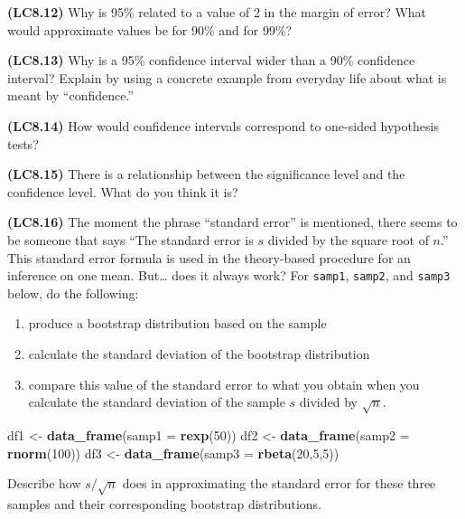 \documentclass[]{tufte-book}
\newenvironment{Shaded}{\begin{snugshade}}{\end{snugshade}}
\newcommand{\KeywordTok}[1]{\textcolor[rgb]{0.13,0.29,0.53}{\textbf{{#1}}}}
\newcommand{\DataTypeTok}[1]{\textcolor[rgb]{0.13,0.29,0.53}{{#1}}}
\newcommand{\DecValTok}[1]{\textcolor[rgb]{0.00,0.00,0.81}{{#1}}}
\newcommand{\StringTok}[1]{\textcolor[rgb]{0.31,0.60,0.02}{{#1}}}
\newcommand{\NormalTok}[1]{{#1}}
\providecommand{\tightlist}{%
  \setlength{\itemsep}{0pt}\setlength{\parskip}{0pt}}
\begin{document}
\textbf{(LC8.12)} Why is 95\% related to a value of 2 in the margin of
error? What would approximate values be for 90\% and for 99\%?

\textbf{(LC8.13)} Why is a 95\% confidence interval wider than a 90\%
confidence interval? Explain by using a concrete example from everyday
life about what is meant by ``confidence.''

\textbf{(LC8.14)} How would confidence intervals correspond to one-sided
hypothesis tests?

\textbf{(LC8.15)} There is a relationship between the significance level
and the confidence level. What do you think it is?

\textbf{(LC8.16)} The moment the phrase ``standard error'' is mentioned,
there seems to be someone that says ``The standard error is \(s\)
divided by the square root of \(n\).'' This standard error formula is
used in the theory-based procedure for an inference on one mean.
But\ldots{} does it always work? For \texttt{samp1}, \texttt{samp2}, and
\texttt{samp3} below, do the following:

\begin{enumerate}
\def\labelenumi{\arabic{enumi}.}
\tightlist
\item
  produce a bootstrap distribution based on the sample
\item
  calculate the standard deviation of the bootstrap distribution
\item
  compare this value of the standard error to what you obtain when you
  calculate the standard deviation of the sample \(s\) divided by
  \(\sqrt{n}\).
\end{enumerate}

\begin{Shaded}
\begin{Highlighting}[]
\NormalTok{df1 <-}\StringTok{ }\KeywordTok{data_frame}\NormalTok{(}\DataTypeTok{samp1 =} \KeywordTok{rexp}\NormalTok{(}\DecValTok{50}\NormalTok{))}
\NormalTok{df2 <-}\StringTok{ }\KeywordTok{data_frame}\NormalTok{(}\DataTypeTok{samp2 =} \KeywordTok{rnorm}\NormalTok{(}\DecValTok{100}\NormalTok{))}
\NormalTok{df3 <-}\StringTok{ }\KeywordTok{data_frame}\NormalTok{(}\DataTypeTok{samp3 =} \KeywordTok{rbeta}\NormalTok{(}\DecValTok{20}\NormalTok{,}\DecValTok{5}\NormalTok{,}\DecValTok{5}\NormalTok{))}
\end{Highlighting}
\end{Shaded}

Describe how \(s / \sqrt{n}\) does in approximating the standard error
for these three samples and their corresponding bootstrap distributions.
\end{document}
